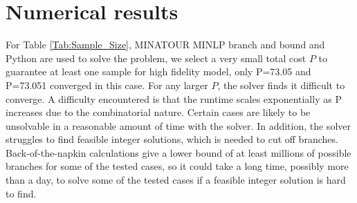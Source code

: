 \section{Numerical results}\label{sec:Num_Result}


%
\begin{table}[ht]
\centering
{}
\caption{Parameters from plasma problem.}
\label{Tab:Parameters}
\end{table}
%



%
\begin{table}[ht]
\centering
{}
\caption{Sample size for real-valued optimization and integer optimization.}
\label{Tab:Sample_Size}
\end{table}
%
For Table \ref{Tab:Sample_Size}, MINATOUR MINLP branch and bound and Python are used to solve the problem, we select a very small total cost $P$ to guarantee at least one sample for high fidelity model, only P=73.05 and P=73.051 converged in this case. For any larger $P$, the solver finds it difficult to converge. A difficulty encountered is that the runtime scales exponentially as P increases due to the combinatorial nature. Certain cases are likely to be unsolvable in a reasonable amount of time with the solver. In addition, the solver struggles to find feasible integer solutions, which is needed to cut off branches. Back-of-the-napkin calculations give a lower bound of at least millions of possible branches for some of the tested cases, so it could take a long time, possibly more than a day, to solve some of the tested cases if a feasible integer solution is hard to find. 

